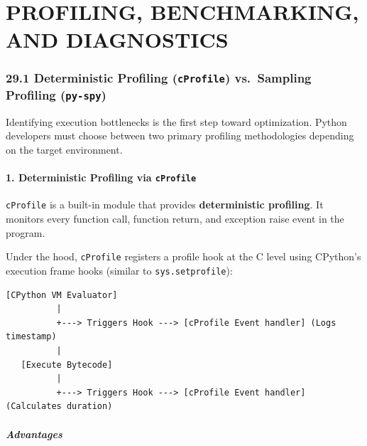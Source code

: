 \hypertarget{profiling-benchmarking-and-diagnostics}{%
\chapter{PROFILING, BENCHMARKING, AND
DIAGNOSTICS}\label{profiling-benchmarking-and-diagnostics}}

\hypertarget{deterministic-profiling-cprofile-vs.-sampling-profiling-py-spy}{%
\subsection{\texorpdfstring{29.1 Deterministic Profiling
(\texttt{cProfile}) vs.~Sampling Profiling
(\texttt{py-spy})}{29.1 Deterministic Profiling (cProfile) vs.~Sampling Profiling (py-spy)}}\label{deterministic-profiling-cprofile-vs.-sampling-profiling-py-spy}}

Identifying execution bottlenecks is the first step toward optimization.
Python developers must choose between two primary profiling
methodologies depending on the target environment.

\hypertarget{deterministic-profiling-via-cprofile}{%
\subsubsection{\texorpdfstring{1. Deterministic Profiling via
\texttt{cProfile}}{1. Deterministic Profiling via cProfile}}\label{deterministic-profiling-via-cprofile}}

\passthrough{\lstinline!cProfile!} is a built-in module that provides
\textbf{deterministic profiling}. It monitors every function call,
function return, and exception raise event in the program.

Under the hood, \passthrough{\lstinline!cProfile!} registers a profile
hook at the C level using CPython's execution frame hooks (similar to
\passthrough{\lstinline!sys.setprofile!}):

\begin{lstlisting}
[CPython VM Evaluator]
          |
          +---> Triggers Hook ---> [cProfile Event handler] (Logs timestamp)
          |
   [Execute Bytecode]
          |
          +---> Triggers Hook ---> [cProfile Event handler] (Calculates duration)
\end{lstlisting}

\hypertarget{advantages}{%
\paragraph{Advantages}\label{advantages}}

